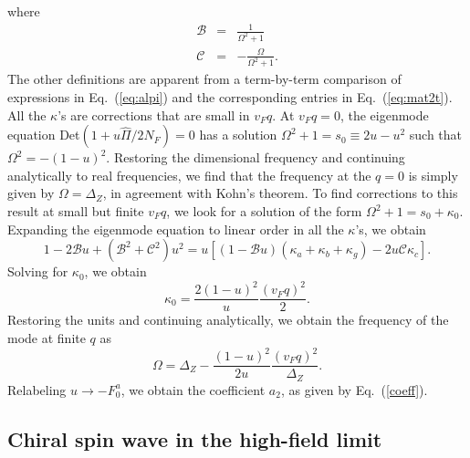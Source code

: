 \documentclass[prb,aps,twocolumn]{revtex4}
\newcommand{\beq}{\begin{equation}}
\newcommand{\eeq}{\end{equation}}
\newcommand{\bea}{\begin{eqnarray}}
\newcommand{\eea}{\end{eqnarray}}
\newcommand{\nn}{\nonumber}
\begin{document}
where \bea \mathcal{B}&=&
\frac{1}{\Omega^2+1}\nn\\
\mathcal{C}&=&-\frac{\Omega}{\Omega^2+1}. \label{bc} \eea The
other definitions are apparent from a term-by-term comparison of
expressions in Eq.~(\ref{eq:alpi}) and the corresponding entries
in Eq.~(\ref{eq:mat2t}). All the $\kappa$'s are corrections that
are small in $v_Fq$. At $v_Fq=0$, the eigenmode equation
Det$(1+u\hat\Pi/2N_F)=0$ has a solution
$\Omega^2+1=s_0\equiv2u-u^2$ such that $\Omega^2=-(1-u)^2$.
Restoring the dimensional frequency and continuing analytically to
real frequencies, we find that  the frequency at the $q=0$ is
simply given by $\Omega=\Delta_Z$, in agreement with Kohn's
theorem. To find corrections to this result at small but finite
$v_Fq$, we look for a solution of the form
$\Omega^2+1=s_0+\kappa_0$. Expanding the eigenmode equation to
linear order in all the $\kappa$'s, we obtain \beq\label{eq:modd}
1-2\mathcal{B}u+(\mathcal{B}^2+\mathcal{C}^2)u^2=
u\left[(1-\mathcal{B}u)(\kappa_a+\kappa_b+\kappa_g)-2u\mathcal{C}\kappa_c\right].
\eeq Solving for $\kappa_0$, we obtain \beq\label{eq:soll}
\kappa_0=\frac{2(1-u)^2}{u}\frac{(v_Fq)^2}{2}. \eeq Restoring the
units and continuing analytically, we obtain the frequency of the
mode at finite $q$ as \beq\label{eq:aaa}
\Omega=\Delta_Z-\frac{(1-u)^2}{2u}\frac{(v_Fq)^2}{\Delta_Z}. \eeq
Relabeling $u\to -F_0^a$, we obtain the coefficient $a_2$, as
given by Eq.~(\ref{coeff}).


\subsection{Chiral spin wave in the high-field limit} \label{app:CSW}
\end{document}
